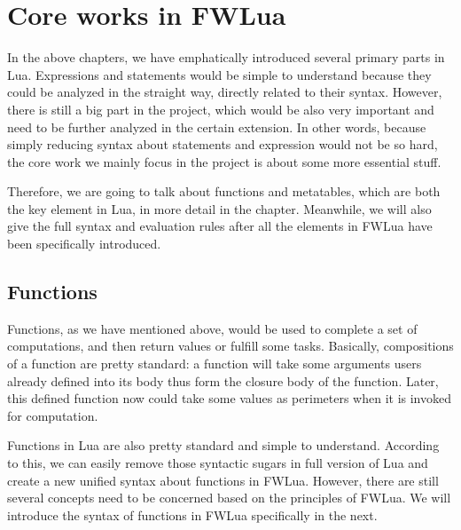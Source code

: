 \chapter{Core works in FWLua}
In the above chapters, we have emphatically introduced several primary parts in Lua. Expressions and statements would be simple to understand because they could be analyzed in the straight way, directly related to their syntax. However, there is still a big part in the project, which would be also very important and need to be further analyzed in the certain extension. In other words, because simply reducing syntax about statements and expression would not be so hard, the core work we mainly focus in the project is about some more essential stuff.

Therefore, we are going to talk about functions and metatables, which are both the key element in Lua, in more detail in the chapter. Meanwhile, we will also give the full syntax and evaluation rules after all the elements in FWLua have been specifically introduced.


\section{Functions}
Functions, as we have mentioned above, would be used to complete a set of computations, and then return values or fulfill some tasks. Basically, compositions of a function are pretty standard: a function will take some arguments users already defined into its body thus form the closure body of the function. Later, this defined function now could take some values as perimeters when it is invoked for computation.

Functions in Lua are also pretty standard and simple to understand. According to this, we can easily remove those syntactic sugars in full version of Lua and create a new unified syntax about functions in FWLua. However, there are still several concepts need to be concerned based on the principles of FWLua. We will introduce the syntax of functions in FWLua specifically in the next.

